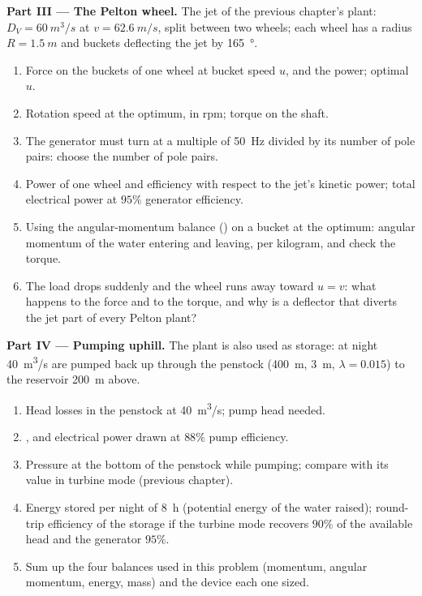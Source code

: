 \begin{problem}
\medskip
\noindent\textbf{Part III --- The Pelton wheel.}
The jet of the previous chapter's plant: $D_V = \qty{60}{m^3/s}$ at $v =
\qty{62.6}{m/s}$, split between two wheels; each wheel has a radius $R =
\qty{1.5}{m}$ and buckets deflecting the jet by \qty{165}{\degree}.
\begin{enumerate}[resume]
  \item Force on the buckets of one wheel at bucket speed $u$, and the
        power; optimal $u$.
  \item Rotation speed at the optimum, in rpm; torque on the shaft.
  \item The generator must turn at a multiple of \qty{50}{Hz} divided by
        its number of pole pairs: choose the number of pole pairs.
  \item Power of one wheel and efficiency with respect to the jet's
        kinetic power; total electrical power at $95\%$ generator
        efficiency.
  \item Using the angular-momentum balance ()
        on a bucket at the optimum: angular momentum of the water
        entering and leaving, per kilogram, and check the torque.
  \item The load drops suddenly and the wheel runs away toward $u =
        v$: what happens to the force and to the torque, and why is a
        deflector that diverts the jet part of every Pelton plant?
\end{enumerate}

\medskip
\noindent\textbf{Part IV --- Pumping uphill.}
The plant is also used as storage: at night \qty{40}{m^3/s} are pumped
back up through the penstock (\qty{400}{m}, \qty{3}{m}, $\lambda = 0.015$) to the
reservoir \qty{200}{m} above.
\begin{enumerate}[resume]
  \item Head losses in the penstock at \qty{40}{m^3/s}; pump head needed.
  \item {}, and electrical power drawn at $88\%$ pump
        efficiency.
  \item Pressure at the bottom of the penstock while pumping; compare
        with its value in turbine mode (previous chapter).
  \item Energy stored per night of \qty{8}{h} (potential energy of the
        water raised); round-trip efficiency of the storage if the
        turbine mode recovers $90\%$ of the available head and the
        generator $95\%$.
  \item Sum up the four balances used in this problem (momentum, angular
        momentum, energy, mass) and the device each one sized.
\end{enumerate}
\end{problem}
